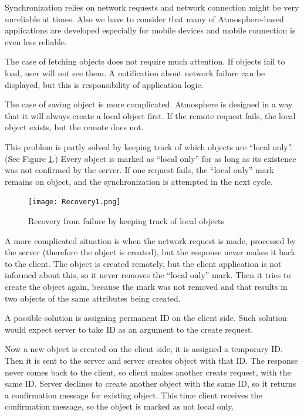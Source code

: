 Synchronization relies on network requests and network connection might be very unreliable at times. Also we have to consider that many of Atmosphere-based applications are developed especially for mobile devices and mobile connection is even less reliable.

The case of fetching objects does not require much attention. If objects fail to load, user will not see them. A notification about network failure can be displayed, but this is responsibility of application logic.

The case of saving object is more complicated. Atmosphere is designed in a way that it will always create a local object first. If the remote request fails, the local object exists, but the remote does not.

This problem is partly solved by keeping track of which objects are ``local only''. (See Figure \ref{fig:recovery1}.) Every object is marked as ``local only'' for as long as its existence was not confirmed by the server.  If one request fails,  the ``local only'' mark remains on object,  and the synchronization is attempted in the next cycle. 

\begin{figure}[htbp]
  \centering
    \texttt{[image: Recovery1.png]}
  \caption{Recovery from failure by keeping track of local objects}
  \label{fig:recovery1}
\end{figure}

A more complicated situation is when the network request is made, processed by the server (therefore the object is created), but the response never makes it back to the client. The object is created remotely, but the client application is not informed about this, so it never removes the ``local only'' mark. Then it tries to create the object again, because the mark was not removed and that results in two objects of the same attributes being created.

A possible solution is assigning permanent ID on the client side. Such solution would expect server to take ID as an argument to the create request.

Now a new object is created on the client side, it is assigned a temporary ID. Then it is sent to the server and server creates object with that ID. The response never comes back to the client, so client makes another create request, with the same ID. Server declines to create another object with the same ID, so it returns a confirmation message for existing object. This time client receives the confirmation message, so the object is marked as not local only.


